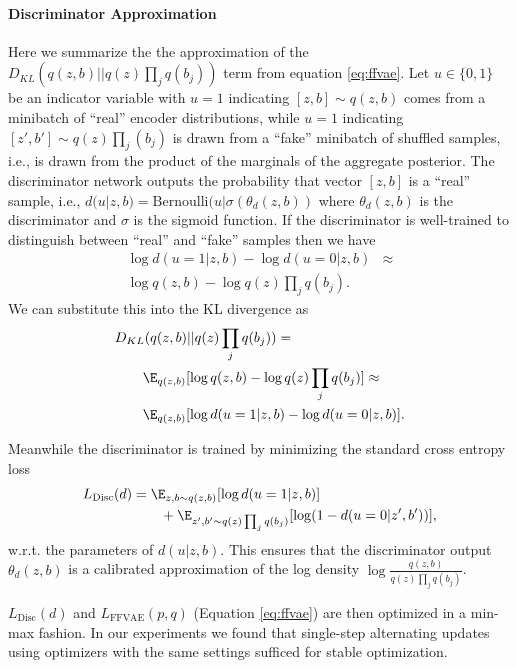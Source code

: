 \paragraph{Discriminator Approximation}
Here we summarize the the approximation of the $D_{KL}(q(z,b)||q(z)\prod_{j} q(b_j))$ term from equation \ref{eq:ffvae}.
Let $u \in \{0, 1\}$ be an indicator variable with $u=1$ indicating $[z,b] \sim q(z,b)$ comes from a minibatch of ``real'' encoder distributions, while $u=1$ indicating $[z',b'] \sim q(z)\prod_j(b_j)$ is drawn from a ``fake'' minibatch of shuffled samples, i.e., is drawn from the product of the marginals of the aggregate posterior.
The discriminator network outputs the probability that vector $[z,b]$ is a ``real'' sample, i.e., 
$d(u|z,b)=\text{Bernoulli}(u|\sigma(\theta_{d}(z,b))$ 
where $\theta_d(z,b)$ 
is the discriminator and $\sigma$ is the sigmoid function.
If the discriminator is well-trained to distinguish between ``real'' and ``fake'' samples then we have 
\begin{align}
    \log d(u=1|z,b) - \log d(u=0|z,b) &\approx \nonumber \\
    \log q(z,b) - \log q(z)\prod_j q(b_j).
\end{align}
We can substitute this into the KL divergence as 
\begin{align}
    &D_{KL}(q(z,b)||q(z)\prod_{j} q(b_j)) = \nonumber \\
    &\quad\quad \E_{q(z,b)}[ \log q(z,b) - \log q(z)\prod_j q(b_j) ] \approx \nonumber \\
    &\quad\quad \E_{q(z,b)}[ \log d(u=1|z,b) - \log d(u=0|z,b)].
\end{align}

Meanwhile the discriminator is trained by minimizing the standard cross entropy loss
\begin{align}
    L_{\text{Disc}}(d) &= \E_{z,b\sim q(z,b)} [\log d(u=1|z,b)] \nonumber \\
    &\quad\quad + \E_{z',b'\sim q(z)\prod_j q(b_j)} [\log ( 1 - d(u=0|z',b') )],
\end{align}
w.r.t. the parameters of $d(u|z,b)$.
This ensures that the discriminator output $\theta_d(z,b)$ is a calibrated approximation of the log density $\log\frac{q(z,b)}{q(z)\prod_j q(b_j)}$.

$L_{\text{Disc}}(d)$ and $L_{\text{FFVAE}}(p,q)$ (Equation \ref{eq:ffvae}) are then optimized in a min-max fashion.
In our experiments we found that single-step alternating updates using optimizers with the same settings sufficed for stable optimization.

